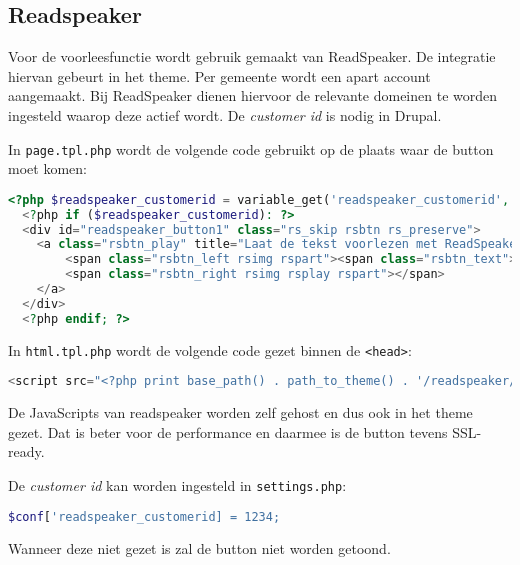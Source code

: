 \subsection{Readspeaker}\label{readspeaker}

Voor de voorleesfunctie wordt gebruik gemaakt van ReadSpeaker. De integratie hiervan gebeurt in het theme. Per gemeente wordt een apart account aangemaakt. Bij ReadSpeaker dienen hiervoor de relevante domeinen te worden ingesteld waarop deze actief wordt. De \emph{customer id} is nodig in Drupal.

In \texttt{page.tpl.php} wordt de volgende code gebruikt op de plaats waar de button moet komen:

\begin{lstlisting}[language=PHP]
  <?php $readspeaker_customerid = variable_get('readspeaker_customerid', 0); ?>
  <?php if ($readspeaker_customerid): ?>
  <div id="readspeaker_button1" class="rs_skip rsbtn rs_preserve">
    <a class="rsbtn_play" title="Laat de tekst voorlezen met ReadSpeaker" href="//app.eu.readspeaker.com/cgi-bin/rsent?customerid=<?php print $readspeaker_customerid; ?>&amp;lang=nl_nl&amp;readid=main&amp;url=<?php echo urlencode($_SERVER['HTTP_HOST'] . $_SERVER['REQUEST_URI']); ?>">
        <span class="rsbtn_left rsimg rspart"><span class="rsbtn_text"><span>Lees voor</span></span></span>
        <span class="rsbtn_right rsimg rsplay rspart"></span>
    </a>
  </div>
  <?php endif; ?>
\end{lstlisting}

In \texttt{html.tpl.php} wordt de volgende code gezet binnen de \texttt{\textless head\textgreater}:
\begin{lstlisting}[language=PHP]
<script src="<?php print base_path() . path_to_theme() . '/readspeaker/ReadSpeaker.js?pids=embhl'; ?>"></script>
\end{lstlisting}

De JavaScripts van readspeaker worden zelf gehost en dus ook in het theme gezet. Dat is beter voor de performance en daarmee is de button tevens SSL-ready.

De \emph{customer id} kan worden ingesteld in \texttt{settings.php}:
\begin{lstlisting}[language=PHP]
$conf['readspeaker_customerid] = 1234;
\end{lstlisting}

Wanneer deze niet gezet is zal de button niet worden getoond.